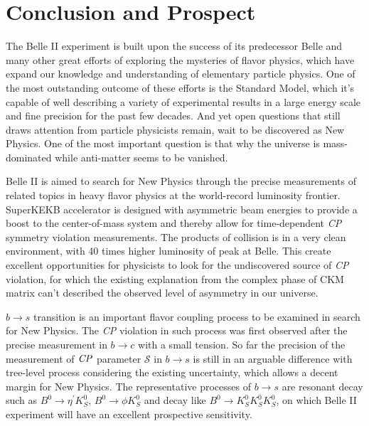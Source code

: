 \chapter{Conclusion and Prospect}

The Belle II experiment is built upon the success of its predecessor Belle and many other great efforts of exploring the mysteries of flavor physics, which have expand our knowledge and understanding of elementary particle physics. One of the most outstanding outcome of these efforts is the Standard Model, which it's capable of well describing a variety of experimental results in a large energy scale and fine precision for the past few decades. And yet open questions that still draws attention from particle physicists remain, wait to be discovered as New Physics. One of the most important question is that why the universe is mass-dominated while anti-matter seems to be vanished. 

Belle II is aimed to search for New Physics through the precise measurements of related topics in heavy flavor physics at the world-record luminosity frontier. SuperKEKB accelerator is designed with asymmetric beam
energies to provide a boost to the center-of-mass system and thereby allow for time-dependent
\textit{CP} symmetry violation measurements. The products of collision is in a very clean environment, with 40 times higher luminosity of peak at Belle. This create excellent opportunities for physicists to look for the undiscovered source of \textit{CP} violation, for which the existing explanation from the complex phase of CKM matrix can't described the observed level of asymmetry in our universe.

 $b\to s$ transition is an important flavor coupling process to be examined in search for New Physics. The \textit{CP} violation in such process was first observed after the precise measurement in $b\to c$ with a small tension. So far the precision of the measurement of $\it{CP}$ parameter $\mathcal{S}$ in $b\to s$ is still in an arguable difference with tree-level process considering the existing uncertainty, which allows a decent margin for New Physics. The representative processes of $b\to s$ are resonant decay such as $B^0 \to \eta^{'} K_S^0$, $B^0 \to \phi K_S^0$ and decay like $B^0 \to K_S^0  K_S^0  K_S^0$, on which Belle II experiment will have an excellent prospective sensitivity.

